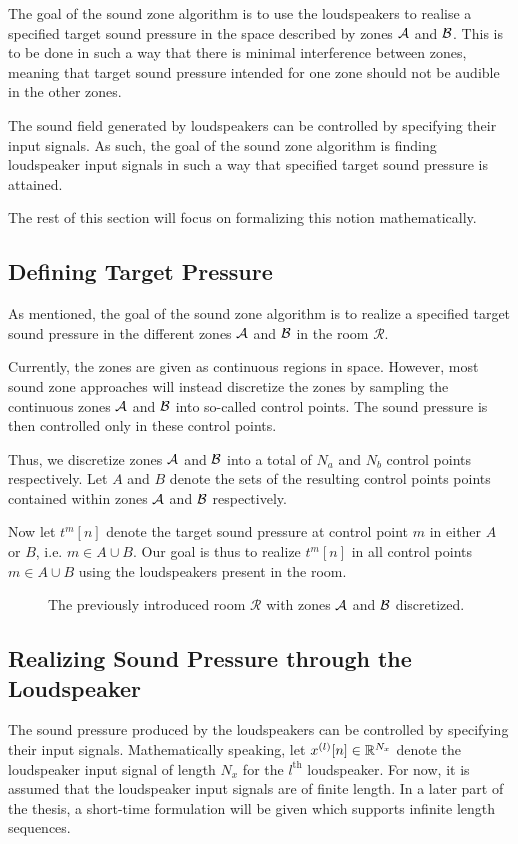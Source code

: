 The goal of the sound zone algorithm is to use the loudspeakers to realise a specified target sound pressure
in the space described by zones $\mathcal{A}$ and $\mathcal{B}$.
This is to be done in such a way that there is minimal interference between zones, 
meaning that target sound pressure intended for one zone should not be audible in the other zones.

The sound field generated by loudspeakers can be controlled by specifying their input signals.
As such, the goal of the sound zone algorithm is finding loudspeaker input signals in such a way that 
specified target sound pressure is attained.

The rest of this section will focus on formalizing this notion mathematically.

\subsection{Defining Target Pressure}
\label{ch:sound_zone:data_model:target_pressure}
As mentioned, the goal of the sound zone algorithm is to realize a specified target sound pressure
in the different zones $\mathcal{A}$ and $\mathcal{B}$ in the room $\mathcal{R}$.

Currently, the zones are given as continuous regions in space.
However, most sound zone approaches will instead discretize the zones by sampling the continuous zones 
$\mathcal{A}$ and $\mathcal{B}$ into so-called control points.
The sound pressure is then controlled only in these control points.

Thus, we discretize zones $\mathcal{A}$ and $\mathcal{B}$ into a total of $N_a$ and $N_b$ control points respectively.   
Let $A$ and $B$ denote the sets of the resulting control points points contained within zones $\mathcal{A}$ and $\mathcal{B}$ respectively.

Now let $t^{m}[n]$ denote the target sound pressure at control point $m$ in either $A$ or $B$, i.e. $m\in A \cup B$.
Our goal is thus to realize $t^{m}[n]$ in all control points $m\in A \cup B$ using the loudspeakers present in the room.

\begin{figure}
    \centering
    
    \caption{The previously introduced room $\mathcal{R}$ with zones $\mathcal{A}$ and $\mathcal{B}$ discretized.}
\end{figure}

\subsection{Realizing Sound Pressure through the Loudspeaker}
\label{ch:sound_zone:data_model:realizing_pressure}
The sound pressure produced by the loudspeakers can be controlled by specifying their input signals.
Mathematically speaking, let $x^{(l)}[n]\in\mathbb{R}^{N_x}$ denote the loudspeaker input signal of length $N_x$ for the $l^\text{th}$ loudspeaker.
For now, it is assumed that the loudspeaker input signals are of finite length. 
In a later part of the thesis, a short-time formulation will be given which supports infinite length sequences. 


